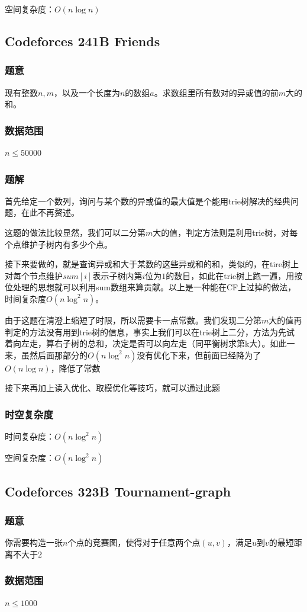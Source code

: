 \documentclass{ctexart}
\begin{document}
空间复杂度：$O(n \log n)$
\subsection{Codeforces 241B Friends}
\subsubsection{题意}
现有整数$n,m$，以及一个长度为$n$的数组$a$。求数组里所有数对的异或值的前$m$大的和。
\subsubsection{数据范围}
$n \le 50000$
\subsubsection{题解}
首先给定一个数列，询问与某个数的异或值的最大值是个能用trie树解决的经典问题，在此不再赘述。

这题的做法比较显然，我们可以二分第$m$大的值，判定方法则是利用trie树，对每个点维护子树内有多少个点。

接下来要做的，就是查询异或和大于某数的这些异或和的和，类似的，在tire树上对每个节点维护$sum[i]$表示子树内第$i$位为$1$的数目，如此在trie树上跑一遍，用按位处理的思想就可以利用sum数组来算贡献。以上是一种能在CF上过掉的做法，时间复杂度$O(n \log^2 n)$。

由于这题在清澄上缩短了时限，所以需要卡一点常数。我们发现二分第$m$大的值再判定的方法没有用到trie树的信息，事实上我们可以在trie树上二分，方法为先试着向左走，算右子树的总和，决定是否可以向左走（同平衡树求第k大）。如此一来，虽然后面那部分的$O(n \log^2 n)$没有优化下来，但前面已经降为了$O(n \log n)$，降低了常数

接下来再加上读入优化、取模优化等技巧，就可以通过此题
\subsubsection{时空复杂度}
时间复杂度：$O(n \log^2 n)$

空间复杂度：$O(n \log^2 n)$
\subsection{Codeforces 323B Tournament-graph}
\subsubsection{题意}
你需要构造一张$n$个点的竞赛图，使得对于任意两个点$(u,v)$，满足$u$到$v$的最短距离不大于$2$
\subsubsection{数据范围}
$n \le 1000$
\end{document}
